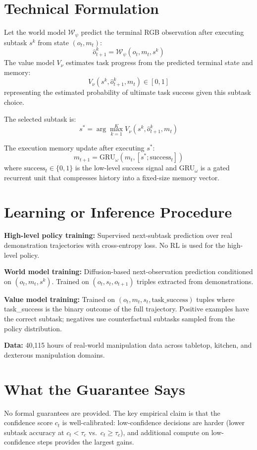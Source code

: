 \documentclass[10pt,twocolumn]{article}
\begin{document}
\section{Technical Formulation}

Let the world model $\mathcal{W}_\psi$ predict the terminal RGB
observation after executing subtask $s^k$ from state $(o_t, m_t)$:
\[
  \hat{o}_{t+1}^k = \mathcal{W}_\psi(o_t, m_t, s^k)
\]
The value model $V_\nu$ estimates task progress from the predicted
terminal state and memory:
\[
  V_\nu(s^k, \hat{o}_{t+1}^k, m_t) \in [0, 1]
\]
representing the estimated probability of ultimate task success
given this subtask choice.

The selected subtask is:
\[
  s^* = \arg\max_{k=1}^K V_\nu(s^k, \hat{o}_{t+1}^k, m_t)
\]

The execution memory update after executing $s^*$:
\[
  m_{t+1} = \text{GRU}_\omega(m_t, [s^*; \text{success}_t])
\]
where $\text{success}_t \in \{0, 1\}$ is the low-level success
signal and GRU$_\omega$ is a gated recurrent unit that compresses
history into a fixed-size memory vector.

\section{Learning or Inference Procedure}

\textbf{High-level policy training:} Supervised next-subtask
prediction over real demonstration trajectories with cross-entropy
loss. No RL is used for the high-level policy.

\textbf{World model training:} Diffusion-based next-observation
prediction conditioned on $(o_t, m_t, s^k)$. Trained on
$(o_t, s_t, o_{t+1})$ triples extracted from demonstrations.

\textbf{Value model training:} Trained on $(o_t, m_t, s_t,
\text{task\_success})$ tuples where task\_success is the
binary outcome of the full trajectory. Positive examples have the
correct subtask; negatives use counterfactual subtasks sampled from
the policy distribution.

\textbf{Data:} 40,115 hours of real-world manipulation data across
tabletop, kitchen, and dexterous manipulation domains.

\section{What the Guarantee Says}

No formal guarantees are provided. The key empirical claim is that
the confidence score $c_t$ is well-calibrated: low-confidence
decisions are harder (lower subtask accuracy at $c_t < \tau_c$ vs.\
$c_t \geq \tau_c$), and additional compute on low-confidence steps
provides the largest gains.
\end{document}
